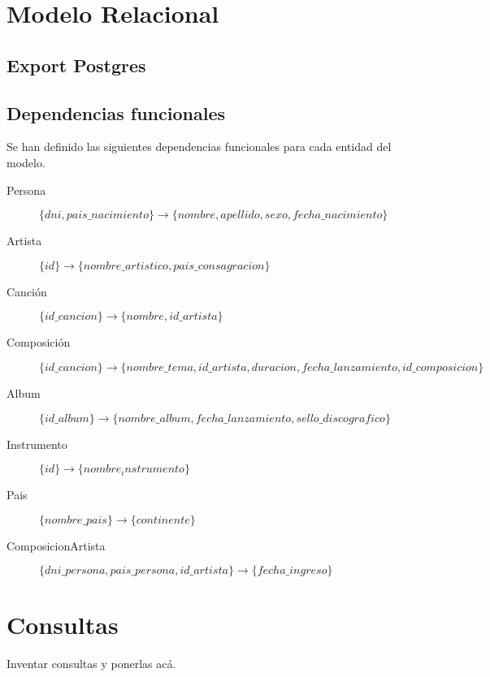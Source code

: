 \documentclass[10pt,a4paper]{article}
\begin{document}
\section{Modelo Relacional}

\subsection{Export Postgres}
%

\subsection{Dependencias funcionales}
Se han definido las siguientes dependencias funcionales para cada entidad del modelo.
\begin{description}

	\item [Persona]
	$	\{ dni, pais\_nacimiento \} \rightarrow \{ nombre, apellido, sexo, fecha\_nacimiento \} $
		
	\item [Artista]
	$	\{ id \} \rightarrow \{ nombre\_artistico, pais\_consagracion \} $
	
	\item [Canción]
		$\{ id\_cancion \} \rightarrow \{ nombre, id\_artista \}$
	
	\item [Composición]
	$\{ id\_cancion \} \rightarrow \{ nombre\_tema, id\_artista, duracion, fecha\_lanzamiento, id\_composicion \}$
	
	\item [Album]
	$\{ id\_album \} \rightarrow \{ nombre\_album, fecha\_lanzamiento, sello\_discografico \}$
	
	\item [Instrumento]
	$\{ id\} \rightarrow \{nombre_instrumento\} $
	
	\item [Pais]
	$ \{nombre\_pais\} \rightarrow \{continente\} $
	
	\item [ComposicionArtista]
	$ \{dni\_persona, pais\_persona, id\_artista \} \rightarrow \{ fecha\_ingreso \} $
		
\end{description}

\newpage

\section{Consultas}

Inventar consultas y ponerlas acá.
\end{document}
